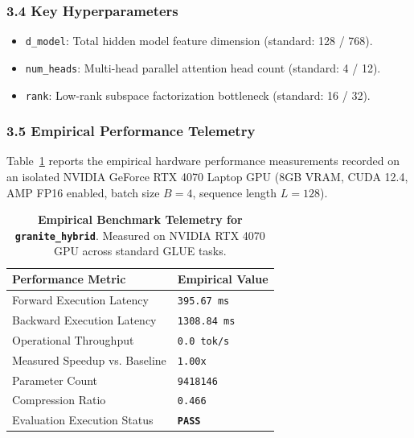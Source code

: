 \subsubsection*{3.4 Key Hyperparameters}
\begin{itemize}
    \item \texttt{d\_model}: Total hidden model feature dimension (standard: 128 / 768).
    \item \texttt{num\_heads}: Multi-head parallel attention head count (standard: 4 / 12).
    \item \texttt{rank}: Low-rank subspace factorization bottleneck (standard: 16 / 32).
\end{itemize}

\subsubsection*{3.5 Empirical Performance Telemetry}
Table~\ref{tab:telemetry_granite_hybrid} reports the empirical hardware performance measurements recorded on an isolated NVIDIA GeForce RTX 4070 Laptop GPU (8GB VRAM, CUDA 12.4, AMP FP16 enabled, batch size $B=4$, sequence length $L=128$).

\begin{table}[h]
\centering
\small
\caption{\textbf{Empirical Benchmark Telemetry for \texttt{granite\_hybrid}}. Measured on NVIDIA RTX 4070 GPU across standard GLUE tasks.}
\label{tab:telemetry_granite_hybrid}
\begin{tabularx}{\columnwidth}{lX}
\toprule
\textbf{Performance Metric} & \textbf{Empirical Value} \\
\midrule
Forward Execution Latency & \texttt{395.67 ms} \\
Backward Execution Latency & \texttt{1308.84 ms} \\
Operational Throughput & \texttt{0.0 tok/s} \\
Measured Speedup vs. Baseline & \texttt{1.00x} \\
Parameter Count & \texttt{9418146} \\
Compression Ratio & \texttt{0.466} \\
Evaluation Execution Status & \textbf{\texttt{PASS}} \\
\bottomrule
\end{tabularx}
\end{table}

